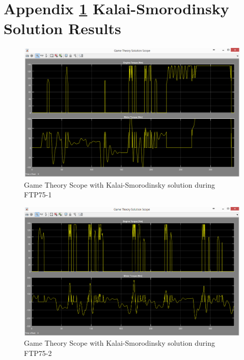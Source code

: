 \chapter{Appendix \ref{app:3} Kalai-Smorodinsky Solution Results}
\label{app:3}

\begin{figure}[h]
\centering
\includegraphics[scale=0.45]{figures/KalaiSmorodinsky/FTP75-1/gameTheory23Juni}
\caption{Game Theory Scope with Kalai-Smorodinsky solution during FTP75-1}
\label{fig:gtks1}
\end{figure}

\begin{figure}[h]
\centering
\includegraphics[scale=0.45]{figures/KalaiSmorodinsky/FTP75-2/gameTheory23Juni}
\caption{Game Theory Scope with Kalai-Smorodinsky solution during FTP75-2}
\label{fig:gtks2}
\end{figure}

